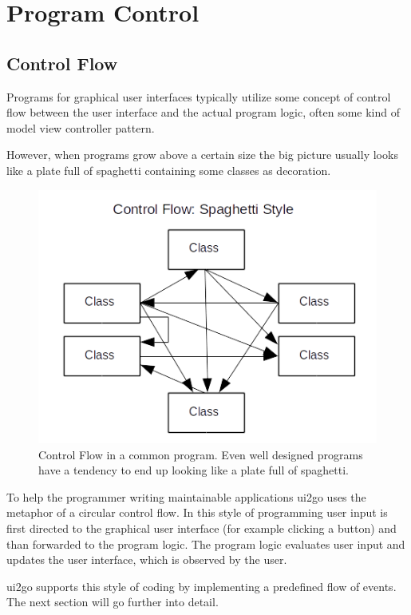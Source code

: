 \section{Program Control}

\subsection{Control Flow}

Programs for graphical user interfaces typically utilize some concept of
control flow between the user interface and the actual program logic,
often some kind of model view controller pattern.

However, when programs grow above a certain size the big picture usually
looks like a plate full of spaghetti containing some classes as
decoration.

\begin{figure}[ht]
\centering
\includegraphics[width=12cm]{img/controlflowspaghetti.png}
\caption{Control Flow in a common program. Even well designed
programs have a tendency to end up looking like a plate full of spaghetti. }
\end{figure}

To help the programmer writing maintainable applications ui2go uses the
metaphor of a circular control flow. In this style of programming user
input is first directed to the graphical user interface (for example
clicking a button) and than forwarded to the program logic. The program
logic evaluates user input and updates the user interface, which is
observed by the user.

ui2go supports this style of coding by implementing a predefined flow of
events. The next section will go further into detail.

